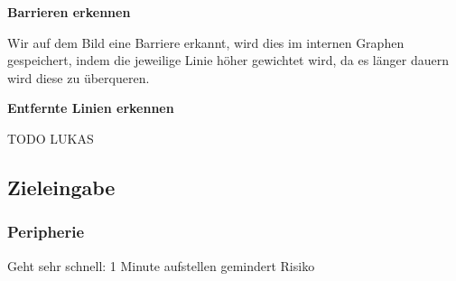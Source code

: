 \textbf{Barrieren erkennen}

Wir auf dem Bild eine Barriere erkannt, wird dies im internen Graphen gespeichert, indem die jeweilige Linie höher gewichtet wird, da es länger dauern wird diese zu überqueren.

\textbf{Entfernte Linien erkennen}

TODO LUKAS

\newpage
\subsection{Zieleingabe}

\subsubsection{Peripherie}
\label{zieleingabe}

Geht sehr schnell: 1 Minute aufstellen gemindert Risiko